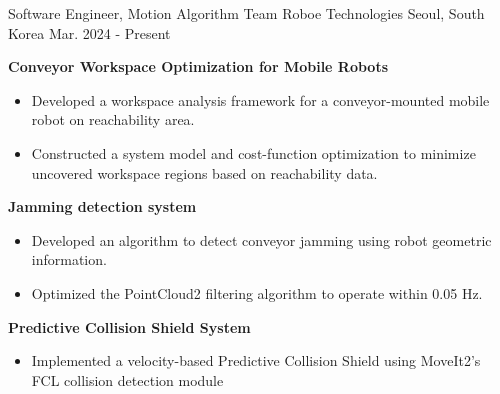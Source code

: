 

\begin{cventries}

  \cventry
    {Software Engineer, Motion Algorithm Team} %
    {Roboe Technologies} %
    {Seoul, South Korea} %
    {Mar. 2024 - Present} %
    {
      \begin{cvitems} %
        \item {\textbf{Conveyor Workspace Optimization for Mobile Robots}
          \begin{itemize}[leftmargin=2ex, nosep, noitemsep]
            \item {Developed a workspace analysis framework for a conveyor-mounted mobile robot on reachability area.}
            \item {Constructed a system model and cost-function optimization to minimize uncovered workspace regions based on reachability data.}
          \end{itemize}
        }
        \item {\textbf{Jamming detection system}
          \begin{itemize}[leftmargin=2ex, nosep, noitemsep]
            \setlength{\parskip}{0pt}
            \renewcommand{\labelitemi}{\bullet}
            \item {Developed an algorithm to detect conveyor jamming using robot geometric information.}
            \item {Optimized the PointCloud2 filtering algorithm to operate within 0.05 Hz.}
          \end{itemize}
        }
        \item {\textbf{Predictive Collision Shield System}
          \begin{itemize}[leftmargin=2ex, nosep, noitemsep]
            \setlength{\parskip}{0pt}
            \renewcommand{\labelitemi}{\bullet}
            \item {Implemented a velocity-based Predictive Collision Shield using MoveIt2’s FCL collision detection module}
          \end{itemize}
}
\end{cvitems}}
\end{cventries}
